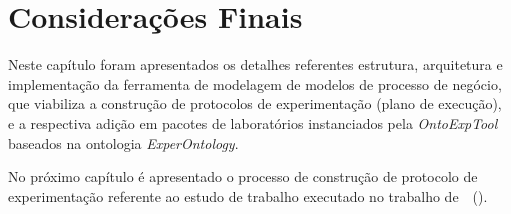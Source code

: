 \section{Considerações Finais}
Neste capítulo foram apresentados os detalhes referentes estrutura, arquitetura e implementação da ferramenta de modelagem de modelos de processo de negócio, que viabiliza a construção de protocolos de experimentação (plano de execução), e a  respectiva adição em pacotes de laboratórios instanciados pela \textit{OntoExpTool} baseados na ontologia \textit{ExperOntology}.

No próximo capítulo é apresentado o processo de construção de protocolo de experimentação referente ao estudo de trabalho executado no trabalho de~~(\citeyear{d2012avaliaccao}).
